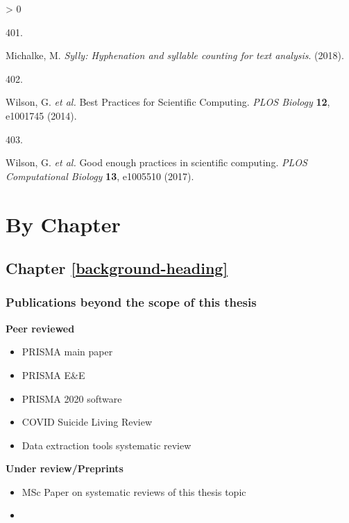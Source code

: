 \documentclass[a4paper, twoside]{templates/ociamthesis}
\newlength{\cslhangindent}
\newlength{\csllabelwidth}
\newenvironment{CSLReferences}[3] %
 {%
  \setlength{\parindent}{0pt}
  \ifodd #1 \everypar{\setlength{\hangindent}{\cslhangindent}}\ignorespaces\fi
  \ifnum #2 > 0
  \setlength{\parskip}{#2\baselineskip}
  \fi
 }%
 {}
\newcommand{\CSLLeftMargin}[1]{\parbox[t]{\maxof{\widthof{#1}}{\csllabelwidth}}{#1}}
\newcommand{\CSLRightInline}[1]{\parbox[t]{\linewidth - \csllabelwidth}{#1}}
\begin{document}
\begin{CSLReferences}{0}{0}
\leavevmode\hypertarget{ref-sylly2018}{}%
\CSLLeftMargin{401. }
\CSLRightInline{Michalke, M. \emph{Sylly: Hyphenation and syllable counting for text analysis}. (2018).}

\leavevmode\hypertarget{ref-wilson2014}{}%
\CSLLeftMargin{402. }
\CSLRightInline{Wilson, G. \emph{et al.} Best {Practices} for {Scientific Computing}. \emph{PLOS Biology} \textbf{12}, e1001745 (2014).}

\leavevmode\hypertarget{ref-wilson2017}{}%
\CSLLeftMargin{403. }
\CSLRightInline{Wilson, G. \emph{et al.} Good enough practices in scientific computing. \emph{PLOS Computational Biology} \textbf{13}, e1005510 (2017).}

\end{CSLReferences}

\startappendices

\hypertarget{chapter-appendix-heading}{%
\chapter{By Chapter}\label{chapter-appendix-heading}}

\hypertarget{appendix-into}{%
\section{Chapter \ref{background-heading}}\label{appendix-into}}

\hypertarget{appendix-publications}{%
\subsection{Publications beyond the scope of this thesis}\label{appendix-publications}}

\textbf{Peer reviewed}

\begin{itemize}
\item
  PRISMA main paper
\item
  PRISMA E\&E
\item
  PRISMA 2020 software
\item
  COVID Suicide Living Review
\item
  Data extraction tools systematic review
\end{itemize}

\textbf{Under review/Preprints}

\begin{itemize}
\item
  MSc Paper on systematic reviews of this thesis topic
\item
\end{itemize}
\end{document}
